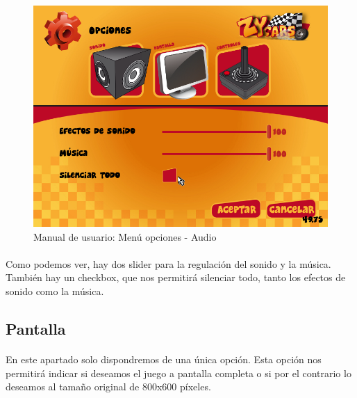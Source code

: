\begin{figure}[H]
  \label{menu_audio}
  \begin{center}
    \includegraphics[scale=0.4]{imagenes/capturas/menuopcionesaudio.png}
  \end{center}
 \caption{Manual de usuario: Menú opciones - Audio}
\end{figure}

\paragraph{}
Como podemos ver, hay dos slider para la regulación del sonido y la música. También hay un checkbox, que nos permitirá silenciar todo, tanto 
los efectos de sonido como la música.

\subsection{Pantalla}

\paragraph{}
En este apartado solo dispondremos de una única opción. Esta opción nos
permitirá indicar si deseamos el juego a pantalla 
completa o si por el contrario lo deseamos al tamaño original de 800x600 píxeles.

